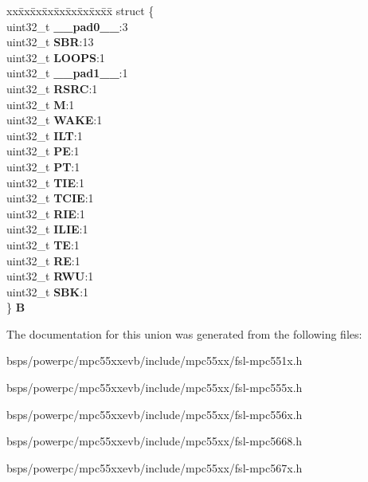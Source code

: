 \begin{DoxyCompactItemize}
\begin{tabbing}
\end{tabbing}\item 
\mbox{\label{unionESCI__tag_1_1ESCI__CR1__tag_a330ccfed40707c02001cc65f3bf83176}} 
\begin{tabbing}
xx\=xx\=xx\=xx\=xx\=xx\=xx\=xx\=xx\=\kill
struct \{\\
\>uint32\_t {\bfseries \_\_pad0\_\_}:3\\
\>uint32\_t {\bfseries SBR}:13\\
\>uint32\_t {\bfseries LOOPS}:1\\
\>uint32\_t {\bfseries \_\_pad1\_\_}:1\\
\>uint32\_t {\bfseries RSRC}:1\\
\>uint32\_t {\bfseries M}:1\\
\>uint32\_t {\bfseries WAKE}:1\\
\>uint32\_t {\bfseries ILT}:1\\
\>uint32\_t {\bfseries PE}:1\\
\>uint32\_t {\bfseries PT}:1\\
\>uint32\_t {\bfseries TIE}:1\\
\>uint32\_t {\bfseries TCIE}:1\\
\>uint32\_t {\bfseries RIE}:1\\
\>uint32\_t {\bfseries ILIE}:1\\
\>uint32\_t {\bfseries TE}:1\\
\>uint32\_t {\bfseries RE}:1\\
\>uint32\_t {\bfseries RWU}:1\\
\>uint32\_t {\bfseries SBK}:1\\
\} {\bfseries B}\\

\end{tabbing}\end{DoxyCompactItemize}


The documentation for this union was generated from the following files\+:\begin{DoxyCompactItemize}
\item 
bsps/powerpc/mpc55xxevb/include/mpc55xx/fsl-\/mpc551x.\+h\item 
bsps/powerpc/mpc55xxevb/include/mpc55xx/fsl-\/mpc555x.\+h\item 
bsps/powerpc/mpc55xxevb/include/mpc55xx/fsl-\/mpc556x.\+h\item 
bsps/powerpc/mpc55xxevb/include/mpc55xx/fsl-\/mpc5668.\+h\item 
bsps/powerpc/mpc55xxevb/include/mpc55xx/fsl-\/mpc567x.\+h\end{DoxyCompactItemize}

